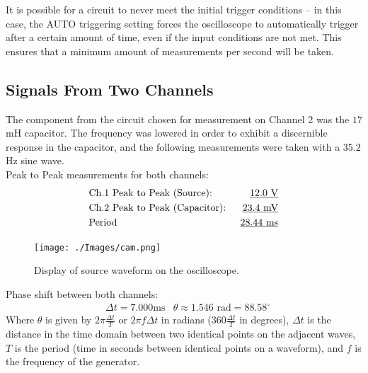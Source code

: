 \documentclass[twocolumn,english]{IEEEtran}
\theoremstyle{plain}
\theoremstyle{plain}
\begin{document}
It is possible for a circuit to never meet the initial trigger conditions -- in this case, the AUTO triggering setting forces the oscilloscope to automatically trigger after a certain amount of time, even if the input conditions are not met. This ensures that a minimum amount of measurements per second will be taken.

\subsection{Signals From Two Channels}
The component from the circuit chosen for measurement on Channel 2 was the $17$ mH capacitor. The frequency was lowered in order to exhibit a discernible response in the capacitor, and the following measurements were taken with a $35.2$ Hz sine wave. \\


\noindent Peak to Peak measurements for both channels:
\begin{align*}
 &\text{Ch.1 Peak to Peak (Source): }		&\text{\underline{$12.0$ V}}	\\
 &\text{Ch.2 Peak to Peak (Capacitor): }	&\text{\underline{$23.4$ mV}}	\\
 &\text{Period}		&\text{\underline{28.44 ms}}
\end{align*}

\begin{figure}[h!]
  \begin{centering}
  \begin{center}
  \texttt{[image: ./Images/cam.png]}
  \label{fig:source_voltage}
  \caption{Display of source waveform on the oscilloscope.}
  \end{center}
  \par\end{centering}
  \end{figure}

\noindent Phase shift between both channels:
\begin{align*}
 &\Delta t = 7.000\text{ms}	&\theta \approx 1.546\text{ rad} = 88.58^{\circ}
\end{align*}
Where $\theta$ is given by  $2\pi\frac{\Delta t}{T}$ or $2\pi f \Delta t$ in radians ($360\frac{\Delta t}{T}$ in degrees), $\Delta t$ is the distance in the time domain between two identical points on the adjacent waves, $T$ is the period (time in seconds between identical points on a waveform), and $f$ is the frequency of the generator.
\end{document}
